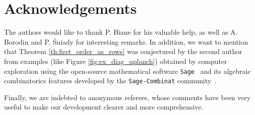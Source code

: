 \documentclass[10pt]{amsart}
\theoremstyle{remark}
\begin{document}
\section*{Acknowledgements}
The authors would like to thank P. Biane for his valuable help, as well as A. Borodin and P. \'Sniady for interesting remarks. In addition, we want to mention that Theorem \ref{th:first_order_as_rows} was conjectured by the second author from examples (like Figure \ref{fig:ex_diag_qplanch}) obtained by computer exploration using the open-source
mathematical software \texttt{Sage}~\cite{sage} and its algebraic combinatorics features developed by the \texttt{Sage-Combinat}
community~\cite{Sage-Combinat}.\bigskip


Finally, we are indebted to anonymous referees, whose comments have been very useful to make our development clearer and more comprehensive.



\end{document}
